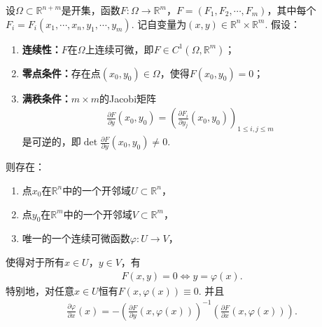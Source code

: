 \documentclass[../../main.tex]{subfiles}%
\begin{document}
\begin{theorem}\label{theorem:隐函数组定理多变量一般形式}
设$\Omega \subset \mathbb{R}^{n+m}$是开集，函数$F:\Omega \to \mathbb{R}^m$，$F=(F_1,F_2,\cdots,F_m)$，其中每个$F_i=F_i(x_1,\cdots,x_n,y_1,\cdots,y_m)$. 记自变量为$(x,y)\in \mathbb{R}^n\times \mathbb{R}^m$. 假设：
\begin{enumerate}[(1)]
\item \textbf{连续性：}$F$在$\Omega$上连续可微，即$F\in C^1(\Omega,\mathbb{R}^m)$；
\item \textbf{零点条件：}存在点$(x_0,y_0)\in\Omega$，使得$F(x_0,y_0)=0$；
\item \textbf{满秩条件：}$m\times m$的Jacobi矩阵
\begin{align*}
\frac{\partial F}{\partial y}(x_0,y_0)=\left(\frac{\partial F_i}{\partial y_j}(x_0,y_0)\right)_{1\leqslant i,j\leqslant m}
\end{align*}
是可逆的，即$\det \frac{\partial F}{\partial y}(x_0,y_0)\neq 0$.
\end{enumerate}
则存在：
\begin{enumerate}[(1)]
\item 点$x_0$在$\mathbb{R}^n$中的一个开邻域$U\subset\mathbb{R}^n$，
\item 点$y_0$在$\mathbb{R}^m$中的一个开邻域$V\subset\mathbb{R}^m$，
\item 唯一的一个连续可微函数$\varphi:U\to V$，
\end{enumerate}
使得对于所有$x\in U$，$y\in V$，有
\begin{align*}
F(x,y)=0\Longleftrightarrow y=\varphi(x).
\end{align*}
特别地，对任意$x\in U$恒有$F(x,\varphi(x))\equiv 0$. 并且
\begin{align*}
\frac{\partial \varphi}{\partial x}(x)=-\left(\frac{\partial F}{\partial y}(x,\varphi(x))\right)^{-1}\left(\frac{\partial F}{\partial x}(x,\varphi(x))\right).
\end{align*}
\end{theorem}
\end{document}
